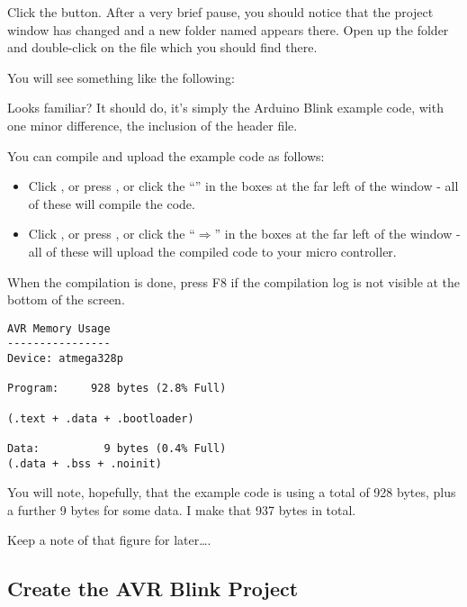 Click the  button. After a very brief pause, you should notice that the project window has changed and a new folder named  appears there. Open up the  folder and double-click on the file  which you should find there.

You will see something like the following:



Looks familiar? It should do, it's simply the Arduino Blink example code, with one minor difference, the inclusion of the  header file.

You can compile and upload the example code as follows:

\begin{itemize}
	\item Click , or press , or click the ``\checkmark'' in the boxes at the far left of the window - all of these will compile the code.
	
	\item Click , or press , or click the ``$\Rightarrow$'' in the boxes at the far left of the window - all of these will upload the compiled code to your micro controller.
\end{itemize}

When the compilation is done, press F8 if the compilation log is not visible at the bottom of the screen.

\begin{lstlisting}[numbers={none},caption={Arduino Blink Memory Usage}]
AVR Memory Usage
----------------
Device: atmega328p

Program:     928 bytes (2.8% Full)

(.text + .data + .bootloader)

Data:          9 bytes (0.4% Full)
(.data + .bss + .noinit)
\end{lstlisting}

You will note, hopefully, that the example code is using a total of 928 bytes, plus a further 9 bytes for some data. I make that 937 bytes in total.

Keep a note of that figure for later\ldots{}.

\subsection{Create the AVR Blink Project}\label{create-the-avr-blink-project}

